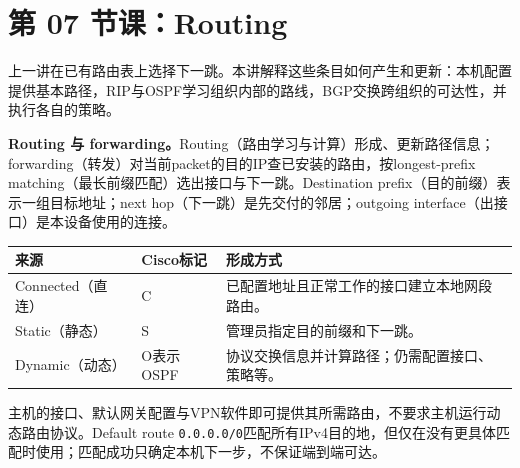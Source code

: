 \begingroup
\renewcommand{\recordid}[1]{}
\renewcommand{\relatedexercise}[2]{\hyperref[exercise:#1]{#2}}

\section{第 07 节课：Routing}
\label{lecture:SC2008-L07}


上一讲在已有路由表上选择下一跳。本讲解释这些条目如何产生和更新：本机配置提供基本路径，RIP与OSPF学习组织内部的路线，BGP交换跨组织的可达性，并执行各自的策略。


\textbf{Routing 与 forwarding。}Routing（路由学习与计算）形成、更新路径信息；forwarding（转发）对当前packet的目的IP查已安装的路由，按longest-prefix matching（最长前缀匹配）选出接口与下一跳。Destination prefix（目的前缀）表示一组目标地址；next hop（下一跳）是先交付的邻居；outgoing interface（出接口）是本设备使用的连接。

\begin{center}
\small
\begin{tabularx}{\textwidth}{@{}llX@{}}
\toprule
来源 & Cisco标记 & 形成方式 \\
\midrule
Connected（直连） & C & 已配置地址且正常工作的接口建立本地网段路由。\\
Static（静态） & S & 管理员指定目的前缀和下一跳。\\
Dynamic（动态） & O表示OSPF & 协议交换信息并计算路径；仍需配置接口、策略等。\\
\bottomrule
\end{tabularx}
\end{center}

主机的接口、默认网关配置与VPN软件即可提供其所需路由，不要求主机运行动态路由协议。Default route \texttt{0.0.0.0/0}匹配所有IPv4目的地，但仅在没有更具体匹配时使用；匹配成功只确定本机下一步，不保证端到端可达。


